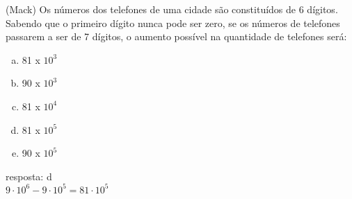 \begin{ex}
	(Mack) Os números dos telefones de uma cidade são constituídos de 6 dígitos. Sabendo que o primeiro dígito nunca pode ser zero, se os números de telefones passarem a ser de 7 dígitos, o aumento possível na quantidade de telefones será:
    \begin{enumerate}[(a)]
    \item 81 x $10^3$
    \item 90 x $10^3$
    \item 81 x $10^4$
    \item 81 x $10^5$
    \item 90 x $10^5$
    \end{enumerate}
      \begin{sol}
        resposta: d \\
    $9\cdot{10}^6-9\cdot{10}^5=81\cdot10^5$
      \end{sol}
\end{ex}